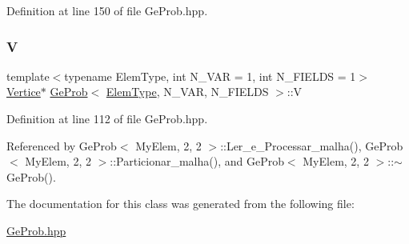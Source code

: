 Definition at line 150 of file Ge\+Prob.\+hpp.

\mbox{\label{classGeProb_aaa26398869b601604a4a5f3032c46070}} 
\subsubsection{\texorpdfstring{V}{V}}
{\footnotesize\ttfamily template$<$typename Elem\+Type, int N\+\_\+\+V\+AR = 1, int N\+\_\+\+F\+I\+E\+L\+DS = 1$>$ \\
\hyperlink{structVertice}{Vertice}$\ast$ \hyperlink{classGeProb}{Ge\+Prob}$<$ \hyperlink{spectral_8h_aaa2c1a7b2d1b12c590d730fe6ac839fa}{Elem\+Type}, N\+\_\+\+V\+AR, N\+\_\+\+F\+I\+E\+L\+DS $>$\+::V\hspace{0.3cm}{\ttfamily [protected]}}



Definition at line 112 of file Ge\+Prob.\+hpp.



Referenced by Ge\+Prob$<$ My\+Elem, 2, 2 $>$\+::\+Ler\+\_\+e\+\_\+\+Processar\+\_\+malha(), Ge\+Prob$<$ My\+Elem, 2, 2 $>$\+::\+Particionar\+\_\+malha(), and Ge\+Prob$<$ My\+Elem, 2, 2 $>$\+::$\sim$\+Ge\+Prob().



The documentation for this class was generated from the following file\+:\begin{DoxyCompactItemize}
\item 
\hyperlink{GeProb_8hpp}{Ge\+Prob.\+hpp}\end{DoxyCompactItemize}
